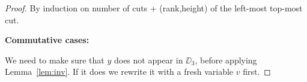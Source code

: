 	\begin{proof}
		
		By induction on number of cuts + (rank,height) of the left-most top-most cut.
		
		\textbf{Commutative cases:}\label{commutative-cases}
		
		\begin{smallequation*}
	\reducesto
\end{smallequation*}

\begin{smallequation*}\hspace*{-2em}
\end{smallequation*}

We need to make sure that $y$ does not appear in $\DD_3$, before applying Lemma~\ref{lem:inv}.
%
If it does we rewrite it with a fresh variable $v$ first.


\end{proof}
